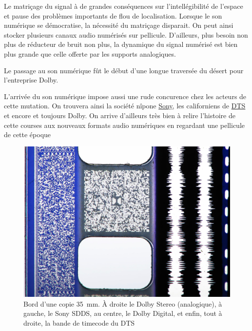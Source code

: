 \documentclass[
  letterpaper,
  DIV=11,
  numbers=noendperiod]{scrreprt}
\begin{document}
Le matriçage du signal à de grandes conséquences sur l'intellégibilité
de l'espace et pause des problèmes importants de flou de localisation.
Lorsque le son numérique se démocratise, la nécessité du matriçage
disparait. On peut ainsi stocker plusieurs canaux audio numérisés sur
pellicule. D'ailleurs, plus besoin non plus de réducteur de bruit non
plus, la dynamique du signal numérisé est bien plus grande que celle
offerte par les supports analogiques.

\begin{tcolorbox}[enhanced jigsaw, leftrule=.75mm, arc=.35mm, bottomtitle=1mm, colback=white, colbacktitle=quarto-callout-note-color!10!white, opacityback=0, left=2mm, rightrule=.15mm, opacitybacktitle=0.6, breakable, toptitle=1mm, titlerule=0mm, bottomrule=.15mm, toprule=.15mm, coltitle=black, title=\textcolor{quarto-callout-note-color}{\faInfo}\hspace{0.5em}{Note}]

Le passage au son numérique fût le début d'une longue traversée du
désert pour l'entreprise Dolby.

\end{tcolorbox}

L'arrivée du son numérique impose aussi une rude concurence chez les
acteurs de cette mutation. On trouvera ainsi la société nîpone
\href{https://en.wikipedia.org/wiki/Sony}{Sony}, les californiens de
\href{https://en.wikipedia.org/wiki/DTS_(company)}{DTS} et encore et
toujours Dolby. On arrive d'ailleurs très bien à relire l'histoire de
cette courses aux nouveaux formats audio numériques en regardant une
pellicule de cette époque

\begin{figure}

{\centering \includegraphics{spatialisation/../_resources/bitmap/various/35mm_film_audio_macro.jpg}

}

\caption{Bord d'une copie 35~mm. À droite le Dolby Stereo (analogique),
à gauche, le Sony SDDS, au centre, le Dolby Digital, et enfin, tout à
droite, la bande de timecode du DTS}

\end{figure}
\end{document}
